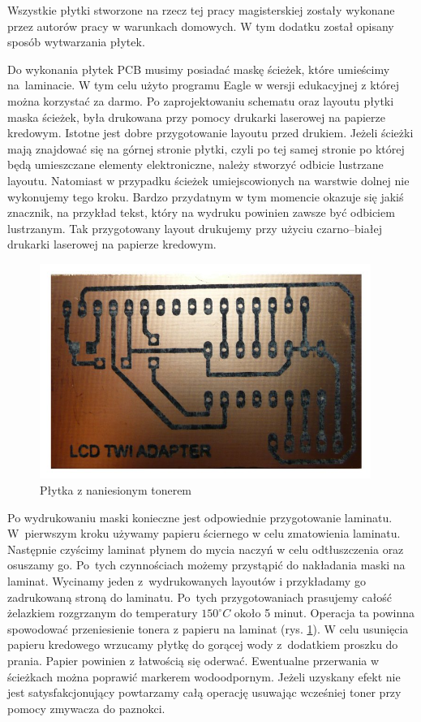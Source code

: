 \label{chap:pcb}
Wszystkie płytki stworzone na rzecz tej pracy magisterskiej zostały wykonane
przez autorów pracy w warunkach domowych. W tym dodatku został opisany sposób
wytwarzania płytek.

Do wykonania płytek PCB musimy posiadać maskę ścieżek, które umieścimy
na~laminacie. W tym celu użyto programu Eagle w wersji edukacyjnej z której można korzystać za darmo. Po zaprojektowaniu schematu oraz layoutu płytki maska
ścieżek, była drukowana przy pomocy drukarki laserowej na papierze kredowym.
Istotne jest dobre przygotowanie layoutu przed drukiem. Jeżeli ścieżki mają
znajdować się na górnej stronie płytki, czyli po tej samej stronie po której będą
umieszczane elementy elektroniczne, należy stworzyć odbicie lustrzane layoutu.
Natomiast w przypadku ścieżek umiejscowionych na warstwie dolnej nie wykonujemy
tego kroku. Bardzo przydatnym w tym momencie okazuje się jakiś znacznik, na
przykład tekst, który na wydruku powinien zawsze być odbiciem lustrzanym. Tak
przygotowany layout drukujemy przy użyciu czarno--białej drukarki laserowej na
papierze kredowym.

\begin{figure}[!ht]
 \centering
 \includegraphics[height=70mm]{../images/appendix/toner.JPG}
 \caption{Płytka z naniesionym tonerem}
 \label{fig:PlytkaZTonerem}
\end{figure}

Po wydrukowaniu maski konieczne jest odpowiednie przygotowanie laminatu.
W~pierwszym kroku używamy papieru ściernego w celu zmatowienia laminatu.
Następnie czyścimy laminat płynem do mycia naczyń w celu odtłuszczenia oraz
osuszamy go. Po~tych czynnościach możemy przystąpić do nakładania maski na
laminat. Wycinamy jeden z~wydrukowanych layoutów i przykładamy go zadrukowaną
stroną do laminatu. Po~tych przygotowaniach prasujemy całość żelazkiem rozgrzanym
do temperatury $150^{\circ}C$ około 5 minut. Operacja ta powinna spowodować
przeniesienie tonera z papieru na laminat (rys. \ref{fig:PlytkaZTonerem}). W celu
usunięcia papieru kredowego wrzucamy płytkę do gorącej wody z~dodatkiem proszku
do prania. Papier powinien z łatwością się oderwać. Ewentualne przerwania w
ścieżkach można poprawić markerem wodoodpornym. Jeżeli uzyskany efekt nie jest
satysfakcjonujący powtarzamy całą operację usuwając wcześniej toner przy pomocy
zmywacza do paznokci.

